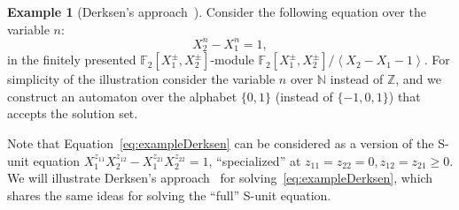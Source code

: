 \documentclass[letterpaper, 11pt, thm-restate]{article}
\numberwithin{equation}{section}
\newcommand{\Z}{\mathbb{Z}}
\newcommand{\N}{\mathbb{N}}
\newcommand{\F}{\mathbb{F}}
\newcommand{\gen}[1]{\left\langle {#1} \right\rangle}
\theoremstyle{definition}
\theoremstyle{definition}
\newtheorem{exmpl}[thrm]{Example}
\theoremstyle{definition}
\begin{document}
\begin{exmpl}[Derksen's approach~\cite{derksen2007skolem}]\label{exmpl:Derksen}
    Consider the following equation over the variable $n$:
    \begin{equation}\label{eq:exampleDerksen}
    X_2^n - X_1^n = 1,
    \end{equation}
    in the finitely presented $\F_2[X_1^{\pm}, X_2^{\pm}]$-module $\F_2[X_1^{\pm}, X_2^{\pm}]/\gen{X_2 - X_1 - 1}$.
    For simplicity of the illustration consider the variable $n$ over $\N$ instead of $\Z$, and we construct an automaton over the alphabet $\{0, 1\}$ (instead of $\{-1, 0, 1\}$) that accepts the solution set.
    
    Note that Equation~\eqref{eq:exampleDerksen} can be considered as a version of the S-unit equation $X_1^{z_{11}} X_2^{z_{12}} - X_1^{z_{21}} X_2^{z_{22}} = 1$, ``specialized'' at $z_{11} = z_{22} = 0, z_{12} = z_{21} \geq 0$.
    We will illustrate Derksen's approach~\cite{derksen2007skolem} for solving~\eqref{eq:exampleDerksen}, which shares the same ideas for solving the ``full'' S-unit equation.


\end{exmpl}
\end{document}

